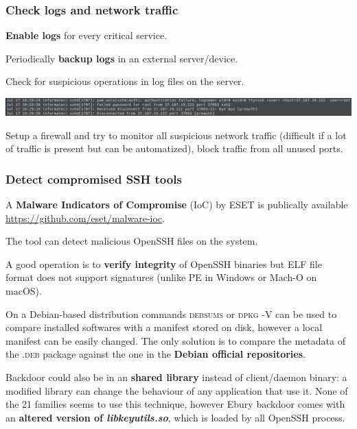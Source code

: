 \begin{frame}
	\frametitle{Check logs and network traffic}
	
	\textbf{Enable logs} for every critical service.

	\smallskip

  Periodically \textbf{backup logs} in an external server/device.

	\smallskip
	
	Check for suspicious operations in log files on the server.

	\medskip
	
  \begin{center}    
  \includegraphics[width=1\textwidth]{images/ssh_log}
  \end{center}
  
	\medskip
	
  Setup a firewall and try to monitor all suspicious network traffic (difficult if a lot of traffic is present but can be automatized), block traffic from all unused ports.

\end{frame}

\begin{frame}
 	\frametitle{Detect compromised SSH tools}
	
	A \textbf{Malware Indicators of Compromise} (IoC) by ESET is publically available \url{https://github.com/eset/malware-ioc}.
	
	The tool can detect malicious OpenSSH files on the system.
	
	\medskip
	
	A good operation is to \textbf{verify integrity} of OpenSSH binaries but ELF file format does not support signatures (unlike PE in Windows or Mach-O on macOS).
	
	\medskip
	
	On a Debian-based distribution commands \textsc{debsums} or \textsc{dpkg -V} can be used to compare installed softwares with a manifest stored on disk, however a local manifest can be easily changed.
	The only solution is to compare the metadata of the \textsc{.deb} package against the one in the \textbf{Debian official repositories}.
	
	\medskip
	
  Backdoor could also be in an \textbf{shared library} instead of client/daemon binary: a modified library can change the behaviour of any application that use it.
  None of the 21 families seems to use this technique, however Ebury backdoor comes with an \textbf{altered version of \textit{libkeyutils.so}}, which is loaded by all OpenSSH process.
  
\end{frame}
